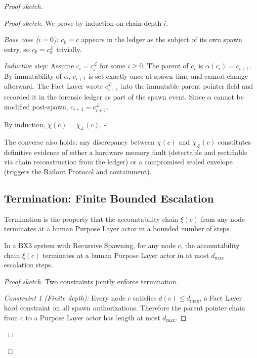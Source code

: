\begin{proof}[Proof sketch]
\begin{proof}[Proof sketch]
We prove by induction on chain depth $i$.

\textit{Base case ($i = 0$):} $c_0 = c$ appears in the ledger as the subject of its own spawn entry, so $c_0 = c_0^{\mathcal{L}}$ trivially.

\textit{Inductive step:} Assume $c_i = c_i^{\mathcal{L}}$ for some $i \geq 0$. The parent of $c_i$ is $\alpha(c_i) = c_{i+1}$. By immutability of $\alpha$, $c_{i+1}$ is set exactly once at spawn time and cannot change afterward. The Fact Layer wrote $c_{i+1}^{\mathcal{L}}$ into the immutable parent pointer field and recorded it in the forensic ledger as part of the spawn event. Since $\alpha$ cannot be modified post-spawn, $c_{i+1} = c_{i+1}^{\mathcal{L}}$.

By induction, $\chi(c) = \chi_{\mathcal{L}}(c)$. $\square$
\endproof

The converse also holds: any discrepancy between $\chi(c)$ and $\chi_{\mathcal{L}}(c)$ constitutes definitive evidence of either a hardware memory fault (detectable and rectifiable via chain reconstruction from the ledger) or a compromised sealed envelope (triggers the Bailout Protocol and containment).

\subsection{Termination: Finite Bounded Escalation}
\label{sec:termination}

Termination is the property that the accountability chain $\xi(c)$ from any node terminates at a human Purpose Layer actor in a bounded number of steps.

\begin{thrm}[Termination]
\label{thrm:termination}
In a BX3 system with Recursive Spawning, for any node $c$, the accountability chain $\xi(c)$ terminates at a human Purpose Layer actor in at most $d_{\max}$ escalation steps.
\end{thrm}

\begin{proof}[Proof sketch]
Two constraints jointly enforce termination.

\textit{Constraint 1 (Finite depth):} Every node $c$ satisfies $d(c) \leq d_{\max}$, a Fact Layer hard constraint on all spawn authorizations. Therefore the parent pointer chain from $c$ to a Purpose Layer actor has length at most $d_{\max}$.


\end{proof}
\end{proof}
\end{proof}
